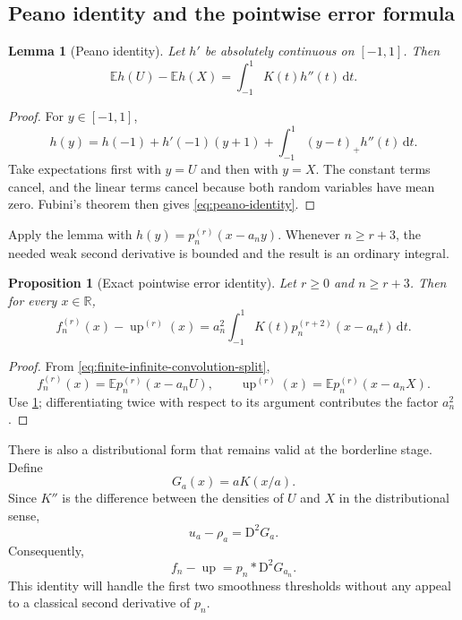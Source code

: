 \documentclass[11pt,oneside]{article}
\newtheorem{proposition}[theorem]{Proposition}
\newtheorem{lemma}[theorem]{Lemma}
\theoremstyle{definition}
\theoremstyle{remark}
\newcommand{\R}{\mathbb R}
\newcommand{\E}{\mathbb E}
\newcommand{\Up}{\operatorname{up}}
\newcommand{\conv}{*}
\newcommand{\dd}{\,\mathrm d}
\newcommand{\pos}[1]{\left(#1\right)_{+}}
\newcommand{\D}{\mathrm D}
\begin{document}
\subsection{Peano identity and the pointwise error formula}

\begin{lemma}[Peano identity]
\label{lem:peano-identity}
Let $h'$ be absolutely continuous on $[-1,1]$.  Then
\begin{equation}
 \E h(U)-\E h(X)=\int_{-1}^{1}K(t)h''(t)\dd t.
 \label{eq:peano-identity}
\end{equation}
\end{lemma}

\begin{proof}
For $y\in[-1,1]$,
\[
 h(y)=h(-1)+h'(-1)(y+1)+\int_{-1}^{1}\pos{y-t}h''(t)\dd t.
\]
Take expectations first with $y=U$ and then with $y=X$.  The constant terms cancel, and
the linear terms cancel because both random variables have mean zero.  Fubini's theorem
then gives \eqref{eq:peano-identity}.
\end{proof}

Apply the lemma with $h(y)=p_n^{(r)}(x-a_ny)$.  Whenever $n\ge r+3$, the needed weak
second derivative is bounded and the result is an ordinary integral.

\begin{proposition}[Exact pointwise error identity]
\label{prop:pointwise-error}
Let $r\ge0$ and $n\ge r+3$.  Then for every $x\in\R$,
\begin{equation}
 f_n^{(r)}(x)-\Up^{(r)}(x)
 =a_n^2\int_{-1}^{1}K(t)
 p_n^{(r+2)}(x-a_nt)\dd t.
 \label{eq:exact-pointwise-error}
\end{equation}
\end{proposition}

\begin{proof}
From \eqref{eq:finite-infinite-convolution-split},
\[
 f_n^{(r)}(x)=\E p_n^{(r)}(x-a_nU),
 \qquad
 \Up^{(r)}(x)=\E p_n^{(r)}(x-a_nX).
\]
Use \cref{lem:peano-identity}; differentiating twice with respect to its argument contributes
the factor $a_n^2$.
\end{proof}

There is also a distributional form that remains valid at the borderline stage.  Define
\begin{equation}
 G_a(x)=aK(x/a).
 \label{eq:Ga-definition}
\end{equation}
Since $K''$ is the difference between the densities of $U$ and $X$ in the distributional
sense,
\begin{equation}
 u_a-\rho_a=\D^2G_a.
 \label{eq:kernel-distribution-identity}
\end{equation}
Consequently,
\begin{equation}
 f_n-\Up=p_n\conv\D^2G_{a_n}.
 \label{eq:error-distribution-convolution}
\end{equation}
This identity will handle the first two smoothness thresholds without any appeal to a
classical second derivative of $p_n$.
\end{document}
